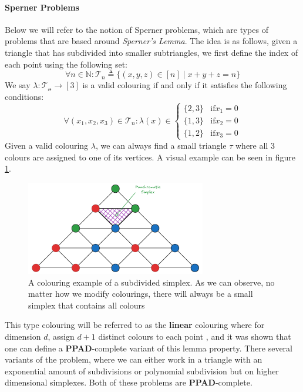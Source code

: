 \paragraph{Sperner Problems}
Below we will refer to the notion of Sperner problems, which are types of problems that
are based around \textit{Sperner's Lemma}. The idea is as follows, given a triangle %
that has subdivided into smaller subtriangles, we first define the index of each point using the following set:
$$
    \forall n \in \mathbb{N}: \mathcal{T}_n \triangleq \{(x,y,z) \in [n] \mid x + y + z = n\}
$$
We say $\lambda : \mathcal{T_n} \to [3]$ is a valid colouring if and only if it satisfies the following conditions:
$$
    \forall (x_1, x_2, x_3) \in \mathcal{T}_n: \lambda(x) \in  \begin{cases}
        \{2,3\} & \text{if} x_1 = 0 \\
        \{1,3\} & \text{if} x_2 = 0 \\
        \{1,2\} & \text{if} x_3 = 0
    \end{cases}
$$
Given a valid colouring $\lambda$, we can always find a small triangle $\tau$ where all 3 colours are assigned
to one of its vertices. A visual example can be seen in figure \ref{fig:chap-2:sperner-example}.

\begin{figure}[h!]
    \centering
    \includegraphics[width=0.7\textwidth]{Chapter2/1729451176N.pdf}
    \caption{A colouring example of a subdivided simplex.
        As we can observe, no matter how we modify colourings, there will always be a small simplex that contains all colours}
    \label{fig:chap-2:sperner-example}
\end{figure}
This type colouring will be referred to as the \textbf{linear} colouring
where for dimension $d$, assign $d+1$ distinct colours to each point \cite{daskalakis_ComplexityComputingNash_2006, chen_Complexity2DDiscrete_2009},
and it was shown that one can define a \textbf{PPAD}-complete variant of this lemma property.
There several variants of the problem, where we can either work in a triangle with an exponential amount of subdivisions
or polynomial subdivision but on higher dimensional simplexes. Both of these problems are \textbf{PPAD}-complete.

